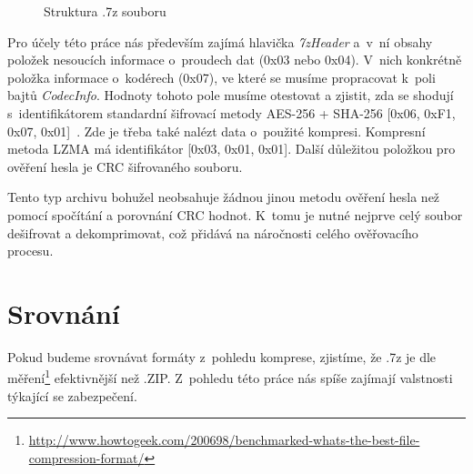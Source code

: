 \begin{figure}[ht]
    \begin{center}
    \end{center}
    \caption{Struktura .7z souboru \cite{Pavlov:2015}}
    \label{7zstruct}
\end{figure}
Pro účely této práce nás především zajímá hlavička {\it 7zHeader} a~v~ní obsahy položek nesoucích
informace o~proudech dat (0x03 nebo 0x04). V~nich konkrétně položka informace o~kodérech (0x07),
ve které se musíme propracovat k~poli bajtů {\it CodecInfo}. Hodnoty tohoto pole musíme otestovat
a zjistit, zda se shodují s~identifikátorem standardní šifrovací metody AES-256 + SHA-256
[0x06, 0xF1, 0x07, 0x01]~\cite{Pavlov:2015}. Zde je třeba také nalézt data o~použité kompresi.
Kompresní metoda LZMA má identifikátor [0x03, 0x01, 0x01]. Další důležitou položkou pro ověření
hesla je CRC šifrovaného souboru.

Tento typ archivu bohužel neobsahuje žádnou jinou metodu ověření hesla než pomocí spočítání a
porovnání CRC hodnot. K~tomu je nutné nejprve celý soubor dešifrovat a dekomprimovat, což přidává
na náročnosti celého ověřovacího procesu.

\section{Srovnání}
Pokud budeme srovnávat formáty z~pohledu komprese, zjistíme, že .7z je dle
měření\footnote{\url{http://www.howtogeek.com/200698/benchmarked-whats-the-best-file-compression-format/}}
efektivnější než .ZIP. Z~pohledu této práce nás spíše zajímají valstnosti týkající se zabezpečení.

